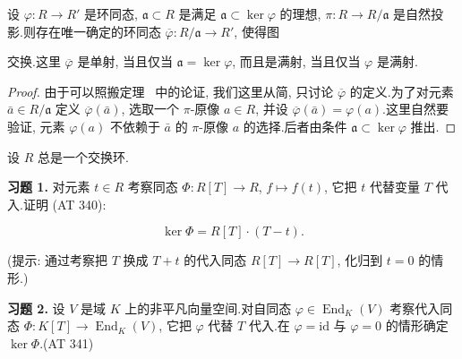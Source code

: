 \begin{theorem}[环的同态定理]\label{thm:5.1.10}
设 $\varphi \colon R \longrightarrow R'$ 是环同态, $\mathfrak{a} \subset R$ 是满足 $\mathfrak{a} \subset \ker \varphi$ 的理想, $\pi \colon R \longrightarrow R/\mathfrak{a}$ 是自然投影.则存在唯一确定的环同态 $\overline{\varphi} \colon R/\mathfrak{a} \longrightarrow R'$, 使得图

\begin{center}
\end{center}

交换.这里 $\overline{\varphi}$ 是单射, 当且仅当 $\mathfrak{a} = \ker \varphi$, 而且是满射, 当且仅当 $\varphi$ 是满射.
\end{theorem}

\begin{proof}
由于可以照搬定理~ 中的论证, 我们这里从简, 只讨论 $\overline{\varphi}$ 的定义.为了对元素 $\bar{a} \in R/\mathfrak{a}$ 定义 $\overline{\varphi}(\bar{a})$, 选取一个 $\pi$-原像 $a \in R$, 并设 $\overline{\varphi}(\bar{a}) = \varphi(a)$.这里自然要验证, 元素 $\varphi(a)$ 不依赖于 $\bar{a}$ 的 $\pi$-原像 $a$ 的选择.后者由条件 $\mathfrak{a} \subset \ker \varphi$ 推出.
\end{proof}

\aufgaben

设 $R$ 总是一个交换环.

\noindent\textbf{习题 1.} 对元素 $t \in R$ 考察同态 $\varPhi \colon R[T] \longrightarrow R$, $f \longmapsto f(t)$, 它把 $t$ 代替变量 $T$ 代入.证明 (AT 340):

\[
\ker \varPhi = R[T] \cdot (T - t)\text{.}
\]

(提示: 通过考察把 $T$ 换成 $T + t$ 的代入同态 $R[T] \longrightarrow R[T]$, 化归到 $t = 0$ 的情形.)

\medskip
\noindent\textbf{习题 2.} 设 $V$ 是域 $K$ 上的非平凡向量空间.对自同态 $\varphi \in \operatorname{End}_K(V)$ 考察代入同态 $\varPhi \colon K[T] \longrightarrow \operatorname{End}_K(V)$, 它把 $\varphi$ 代替 $T$ 代入.在 $\varphi = \mathrm{id}$ 与 $\varphi = 0$ 的情形确定 $\ker \varPhi$.(AT 341)

